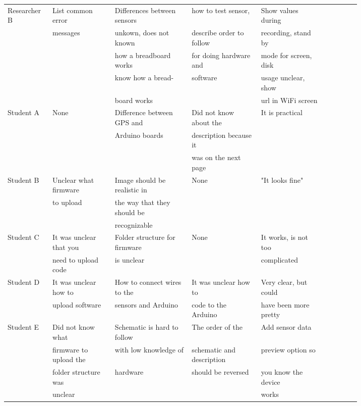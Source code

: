 \documentclass[conference]{IEEEtran}
\begin{document}
\begin{figure*}[ht]
\begin{enumerate}
\begin{enumerate}
\begin{figure*}[!ht]
\begin{tabular}{ | l | l | l | l | l | l | l | l | l | l | }
			Researcher B	& List common error			& Differences between sensors	& how to test sensor,		& Show values during	\\ 
							& messages 					& unkown, does not known 		& describe order to	follow	& recording, stand by	\\
							& 							& how a breadboard works		& for doing	hardware and	& mode for screen, disk	\\
							& 							& know how a bread-				& software					& usage unclear, show	\\
							& 							& board works					& 							& url in WiFi screen	\\	\hline

			Student A		& None						& Difference between GPS and 	& Did not know about the	& It is practical		\\
							&  							& Arduino boards				& description because it 	& 						\\
							&  							& 								& was on the next page		& 						\\ \hline

			Student B		& Unclear what firmware		& Image	should be realistic in	& None						& "It looks fine"		\\ 
							& to upload					& the way that they should be 	& 							& 						\\ 
							&  							& recognizable					& 							& 						\\ \hline
							

			Student C		& It was unclear that you	& Folder structure for firmware& None						& It works, is not too	\\ 
							& need to upload code		& is unclear					& 							& complicated			\\ \hline

			Student D		& It was unclear how to 	& How to connect wires to the	& It was unclear how to 	& Very clear, but could	\\ 
							& upload software			& sensors and Arduino			& code to the Arduino		& have been more pretty	\\ \hline

			Student E		& Did not know what 		& Schematic is hard to follow	& The order of the 			& Add sensor data		\\ 
							& firmware to upload the	& with low knowledge of 		& schematic and description	& preview option so		\\ 
							& folder structure was 		& hardware						& should be reversed		& you know the device	\\ 
							& unclear					& 								& 							& works					\\ \hline
	

\end{tabular}
\end{figure*}
\end{enumerate}
\end{enumerate}
\end{figure*}
\end{document}
